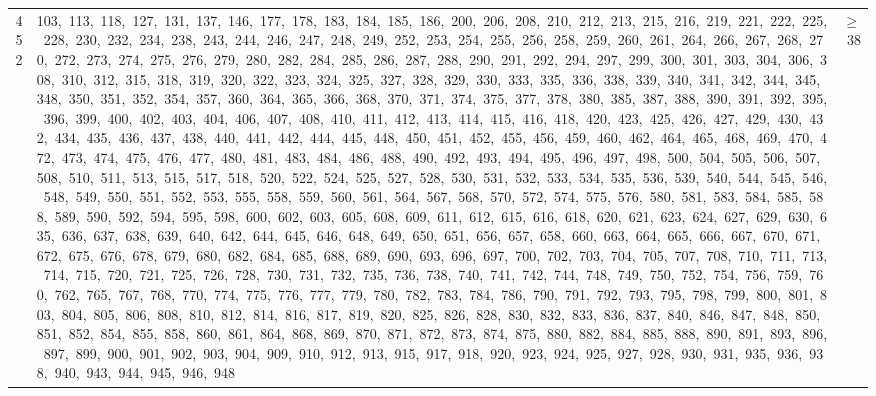 \begin{longtable}{c|p{}|r}
452 & 103,\ 113,\ 118,\ 127,\ 131,\ 137,\ 146,\ 177,\ 178,\ 183,\ 184,\ 185,\ 186,\ 200,\ 206,\ 208,\ 210,\ 212,\ 213,\ 215,\ 216,\ 219,\ 221,\ 222,\ 225,\ 228,\ 230,\ 232,\ 234,\ 238,\ 243,\ 244,\ 246,\ 247,\ 248,\ 249,\ 252,\ 253,\ 254,\ 255,\ 256,\ 258,\ 259,\ 260,\ 261,\ 264,\ 266,\ 267,\ 268,\ 270,\ 272,\ 273,\ 274,\ 275,\ 276,\ 279,\ 280,\ 282,\ 284,\ 285,\ 286,\ 287,\ 288,\ 290,\ 291,\ 292,\ 294,\ 297,\ 299,\ 300,\ 301,\ 303,\ 304,\ 306,\ 308,\ 310,\ 312,\ 315,\ 318,\ 319,\ 320,\ 322,\ 323,\ 324,\ 325,\ 327,\ 328,\ 329,\ 330,\ 333,\ 335,\ 336,\ 338,\ 339,\ 340,\ 341,\ 342,\ 344,\ 345,\ 348,\ 350,\ 351,\ 352,\ 354,\ 357,\ 360,\ 364,\ 365,\ 366,\ 368,\ 370,\ 371,\ 374,\ 375,\ 377,\ 378,\ 380,\ 385,\ 387,\ 388,\ 390,\ 391,\ 392,\ 395,\ 396,\ 399,\ 400,\ 402,\ 403,\ 404,\ 406,\ 407,\ 408,\ 410,\ 411,\ 412,\ 413,\ 414,\ 415,\ 416,\ 418,\ 420,\ 423,\ 425,\ 426,\ 427,\ 429,\ 430,\ 432,\ 434,\ 435,\ 436,\ 437,\ 438,\ 440,\ 441,\ 442,\ 444,\ 445,\ 448,\ 450,\ 451,\ 452,\ 455,\ 456,\ 459,\ 460,\ 462,\ 464,\ 465,\ 468,\ 469,\ 470,\ 472,\ 473,\ 474,\ 475,\ 476,\ 477,\ 480,\ 481,\ 483,\ 484,\ 486,\ 488,\ 490,\ 492,\ 493,\ 494,\ 495,\ 496,\ 497,\ 498,\ 500,\ 504,\ 505,\ 506,\ 507,\ 508,\ 510,\ 511,\ 513,\ 515,\ 517,\ 518,\ 520,\ 522,\ 524,\ 525,\ 527,\ 528,\ 530,\ 531,\ 532,\ 533,\ 534,\ 535,\ 536,\ 539,\ 540,\ 544,\ 545,\ 546,\ 548,\ 549,\ 550,\ 551,\ 552,\ 553,\ 555,\ 558,\ 559,\ 560,\ 561,\ 564,\ 567,\ 568,\ 570,\ 572,\ 574,\ 575,\ 576,\ 580,\ 581,\ 583,\ 584,\ 585,\ 588,\ 589,\ 590,\ 592,\ 594,\ 595,\ 598,\ 600,\ 602,\ 603,\ 605,\ 608,\ 609,\ 611,\ 612,\ 615,\ 616,\ 618,\ 620,\ 621,\ 623,\ 624,\ 627,\ 629,\ 630,\ 635,\ 636,\ 637,\ 638,\ 639,\ 640,\ 642,\ 644,\ 645,\ 646,\ 648,\ 649,\ 650,\ 651,\ 656,\ 657,\ 658,\ 660,\ 663,\ 664,\ 665,\ 666,\ 667,\ 670,\ 671,\ 672,\ 675,\ 676,\ 678,\ 679,\ 680,\ 682,\ 684,\ 685,\ 688,\ 689,\ 690,\ 693,\ 696,\ 697,\ 700,\ 702,\ 703,\ 704,\ 705,\ 707,\ 708,\ 710,\ 711,\ 713,\ 714,\ 715,\ 720,\ 721,\ 725,\ 726,\ 728,\ 730,\ 731,\ 732,\ 735,\ 736,\ 738,\ 740,\ 741,\ 742,\ 744,\ 748,\ 749,\ 750,\ 752,\ 754,\ 756,\ 759,\ 760,\ 762,\ 765,\ 767,\ 768,\ 770,\ 774,\ 775,\ 776,\ 777,\ 779,\ 780,\ 782,\ 783,\ 784,\ 786,\ 790,\ 791,\ 792,\ 793,\ 795,\ 798,\ 799,\ 800,\ 801,\ 803,\ 804,\ 805,\ 806,\ 808,\ 810,\ 812,\ 814,\ 816,\ 817,\ 819,\ 820,\ 825,\ 826,\ 828,\ 830,\ 832,\ 833,\ 836,\ 837,\ 840,\ 846,\ 847,\ 848,\ 850,\ 851,\ 852,\ 854,\ 855,\ 858,\ 860,\ 861,\ 864,\ 868,\ 869,\ 870,\ 871,\ 872,\ 873,\ 874,\ 875,\ 880,\ 882,\ 884,\ 885,\ 888,\ 890,\ 891,\ 893,\ 896,\ 897,\ 899,\ 900,\ 901,\ 902,\ 903,\ 904,\ 909,\ 910,\ 912,\ 913,\ 915,\ 917,\ 918,\ 920,\ 923,\ 924,\ 925,\ 927,\ 928,\ 930,\ 931,\ 935,\ 936,\ 938,\ 940,\ 943,\ 944,\ 945,\ 946,\ 948 & $\ge$ 38 \\

\end{longtable}
